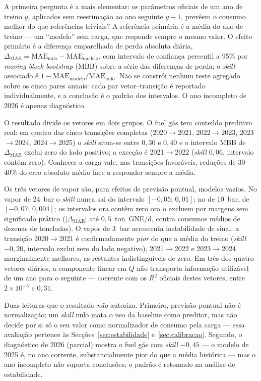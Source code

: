 A primeira pergunta é a mais elementar: os parâmetros oficiais
de um ano de treino $y$, aplicados sem reestimação ao ano seguinte $y{+}1$,
prevêem o consumo melhor do que referências triviais? A referência primária é
a média do ano de treino --- um ``modelo'' sem carga, que responde sempre o
mesmo valor. O efeito primário é a diferença emparelhada de perda absoluta
diária, $\Delta_{\mathrm{MAE}} = \mathrm{MAE}_{\mathrm{nulo}} -
\mathrm{MAE}_{\mathrm{modelo}}$, com intervalo de confiança percentil a 95\%
por \emph{moving-block bootstrap} (MBB) sobre a série das diferenças de
perda; o \emph{skill} associado é
$1 - \mathrm{MAE}_{\mathrm{modelo}}/\mathrm{MAE}_{\mathrm{nulo}}$. Não se
constrói nenhum teste agregado sobre os cinco pares anuais: cada par
vetor--transição é reportado individualmente, e a conclusão é o padrão dos
intervalos. O ano incompleto de 2026 é apenas diagnóstico.

O resultado divide os vetores em dois grupos. O fuel gás tem conteúdo
preditivo real: em quatro das cinco transições completas
(2020${\to}$2021, 2022${\to}$2023, 2023${\to}$2024, 2024${\to}$2025) o
\emph{skill} situa-se entre $0{,}30$ e $0{,}40$ e o intervalo MBB de
$\Delta_{\mathrm{MAE}}$ exclui zero do lado positivo; a exceção é
2021${\to}$2022 (\emph{skill} $0{,}06$, intervalo contém zero). Conhecer a
carga vale, nas transições favoráveis, reduções de 30--40\% do erro absoluto
médio face a responder sempre a média.

Os três vetores de vapor são, para efeitos de previsão pontual, modelos
vazios. No vapor de 24~bar o \emph{skill} nunca sai do intervalo
$[-0{,}05;\,0{,}01]$; no de 10~bar, de $[-0{,}07;\,0{,}004]$; os intervalos
ora contêm zero ora o excluem por margens sem significado prático
($|\Delta_{\mathrm{MAE}}|$ até $0{,}5$~ton~GNE/d, contra consumos médios de
dezenas de toneladas). O vapor de 3~bar acrescenta instabilidade de sinal: a
transição 2020${\to}$2021 é confirmadamente \emph{pior} do que a média do
treino (\emph{skill} $-0{,}20$, intervalo exclui zero do lado negativo),
2021${\to}$2022 e 2023${\to}$2024 marginalmente melhores, as restantes
indistinguíveis de zero. Em três dos quatro vetores diários, a componente
linear em $Q$ não transporta informação utilizável de um ano para o seguinte
--- coerente com os $R^2$ oficiais destes vetores, entre $2\times10^{-5}$ e
$0{,}31$.

Duas leituras que o resultado \emph{não} autoriza. Primeiro, previsão pontual
não é normalização: um \emph{skill} nulo mata o uso da baseline como preditor,
mas não decide por si só o seu valor como normalizador de consumo pela carga
--- essa avaliação pertence às Secções~\ref{sec:estabilidade}
e~\ref{sec:calibracao}. Segundo, o diagnóstico de 2026 (parcial) mostra o
fuel gás com \emph{skill} $-0{,}45$ --- o modelo de 2025 é, no ano corrente,
substancialmente pior do que a média histórica --- mas o ano incompleto não
suporta conclusões; o padrão é retomado na análise de estabilidade.

